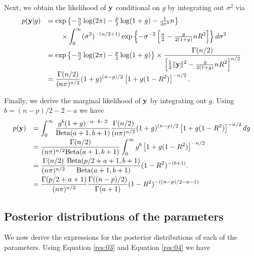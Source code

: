 \documentclass{amsart}[12pt]
\begin{document}
Next, we obtain the likelihood of ${\bf y}$ conditional on $g$ by integrating out $\sigma^2$ via
$$
\begin{array}{rl}
	\displaystyle p({\bf y}|g) 
	  & \displaystyle = \exp\left\{                                                                                 
	- \tfrac{n}{2}\log(2\pi) - \tfrac{p}{2}\log(1+g) 
	- \tfrac{1}{2\sigma^2}n
	\right\}
	\\ [1ex]
	  & \displaystyle \qquad \times                                                                                 
	\int_0^\infty (\sigma^2)^{-(n/2 + 1)}
	\exp\left\{
	- \sigma^{-2} \left[ \tfrac{n}{2} - \tfrac{g}{2(1+g)} nR^2 \right] 
	\right\} d\sigma^2
	\\ [2ex]
	  & \displaystyle = \exp\left\{                                                                                 
	- \tfrac{n}{2}\log(2\pi) - \tfrac{p}{2}\log(1+g)
	\right\}
	\times 
	\frac{\Gamma(n/2)}{\displaystyle \left[ \tfrac{1}{2}\|{\bf y}\|^2 - \tfrac{g}{2(1+g)}nR^2 \right] ^{n/2}}
	\\ [2ex]
	  & \displaystyle = \frac{\Gamma(n/2)}{(n\pi)^{n/2}} (1 + g)^{(n-p)/2} \left[  1 + g(1 -  R^2) \right] ^{-n/2}. 
\end{array}
$$

\noindent Finally, we derive the marginal likelihood of ${\bf y}$ by integrating out $g$. Using $b= (n-p)/2 - 2 - a$ we have
$$
\begin{array}{rl}
	\displaystyle p({\bf y}) 
	  & \displaystyle = \int_0^\infty                                         
	\frac{g^{b}(1 + g)^{-a-b-2}}{\mbox{Beta}(a+1,b+1)}
	\frac{\Gamma(n/2)}{(n\pi)^{n/2}} (1 + g)^{(n-p)/2} \left[  1 + g(1 -  R^2) \right]^{-n/2}
	dg
	\\ [2ex]
	  & \displaystyle = \frac{\Gamma(n/2)}{(n\pi)^{n/2} \mbox{Beta}(a+1,b+1)} 
	\int_0^\infty g^{b} \left[  1 + g(1 -  R^2) \right]^{-n/2}
	\\ [2ex]
	  & \displaystyle = \frac{\Gamma(n/2) }{(n\pi)^{n/2}}                     
	\frac{\mbox{Beta}( p/2 + a + 1,b+1)}{\mbox{Beta}(a+1,b+1)}
	(1 -  R^2)^{-(b+1)}.
	\\ [2ex]
	  & \displaystyle                                                         
	= \frac{\Gamma( p/2 + a + 1)}{(n\pi)^{n/2}} 
	\frac{\Gamma((n-p)/2)}{\Gamma(a+1)} (1 -  R^2)^{-((n-p)/2 - a - 1)} \\
\end{array}
$$

\subsection{Posterior distributions of the parameters}
We now derive the expressions for the posterior distributions of each of the parameters. Using Equation
\ref{res:03} and Equation \ref{res:04} we have
\end{document}
